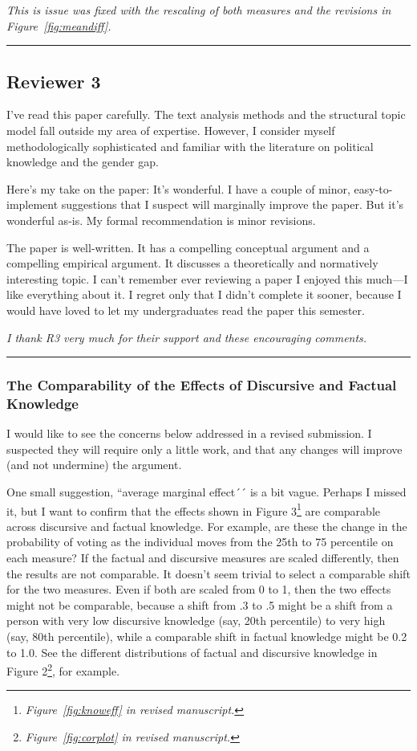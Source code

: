 \textit{This is issue was fixed with the rescaling of both measures and the revisions in Figure~\ref{fig:meandiff}.}


\rule{\linewidth}{.01cm}


\subsection*{Reviewer 3}

I’ve read this paper carefully. The text analysis methods and the structural topic model fall outside my area of expertise. However, I consider myself methodologically sophisticated and familiar with the literature on political knowledge and the gender gap.

Here’s my take on the paper: It’s wonderful. I have a couple of minor, easy-to-implement suggestions that I suspect will marginally improve the paper. But it’s wonderful as-is. My formal recommendation is minor revisions.

The paper is well-written. It has a compelling conceptual argument and a compelling empirical argument. It discusses a theoretically and normatively interesting topic. I can’t remember ever reviewing a paper I enjoyed this much—I like everything about it. I regret only that I didn’t complete it sooner, because I would have loved to let my undergraduates read the paper this semester.

\textit{I thank R3 very much for their support and these encouraging comments.}

\rule{\linewidth}{.01cm}


\subsubsection*{The Comparability of the Effects of Discursive and Factual Knowledge}

I would like to see the concerns below addressed in a revised submission. I suspected they will require only a little work, and that any changes will improve (and not undermine) the argument. 

One small suggestion, ``average marginal effect´´ is a bit vague. Perhaps I missed it, but I want to confirm that the effects shown in Figure 3\footnote{\textit{Figure~\ref{fig:knoweff} in revised manuscript.}} are comparable across discursive and factual knowledge. For example, are these the change in the probability of voting as the individual moves from the 25th to 75 percentile on each measure? If the factual and discursive measures are scaled differently, then the results are not comparable. It doesn’t seem trivial to select a comparable shift for the two measures. Even if both are scaled from 0 to 1, then the two effects might not be comparable, because a shift from .3 to .5 might be a shift from a person with very low discursive knowledge (say, 20th percentile) to very high (say, 80th percentile), while a comparable shift in factual knowledge might be 0.2 to 1.0. See the different distributions of factual and discursive knowledge in Figure 2\footnote{\textit{Figure~\ref{fig:corplot} in revised manuscript.}}, for example.

